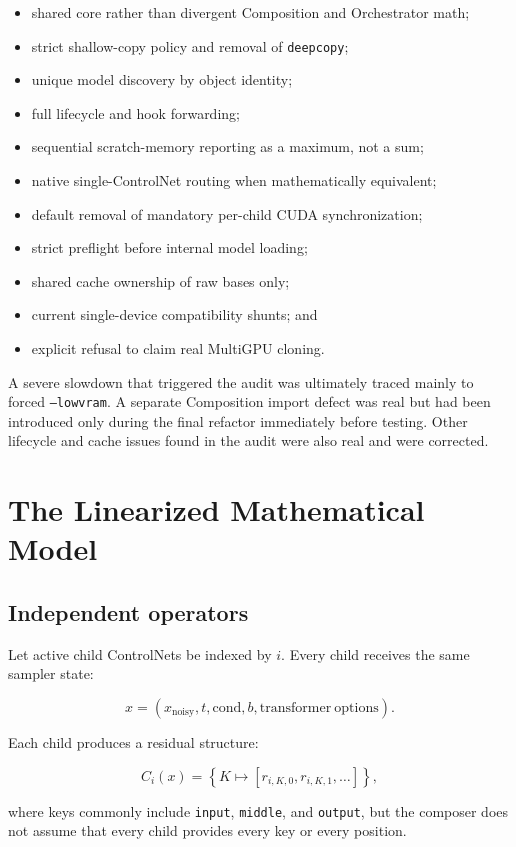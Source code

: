 \documentclass[11pt]{article}
\newcommand{\code}[1]{\texttt{#1}}
\begin{document}
\begin{itemize}
  \item shared core rather than divergent Composition and Orchestrator math;
  \item strict shallow-copy policy and removal of \code{deepcopy};
  \item unique model discovery by object identity;
  \item full lifecycle and hook forwarding;
  \item sequential scratch-memory reporting as a maximum, not a sum;
  \item native single-ControlNet routing when mathematically equivalent;
  \item default removal of mandatory per-child CUDA synchronization;
  \item strict preflight before internal model loading;
  \item shared cache ownership of raw bases only;
  \item current single-device compatibility shunts; and
  \item explicit refusal to claim real MultiGPU cloning.
\end{itemize}

A severe slowdown that triggered the audit was ultimately traced mainly to forced \code{--lowvram}. A separate Composition import defect was real but had been introduced only during the final refactor immediately before testing. Other lifecycle and cache issues found in the audit were also real and were corrected.

\section{The Linearized Mathematical Model}

\subsection{Independent operators}

Let active child ControlNets be indexed by $i$. Every child receives the same sampler state:

\[
x = (x_{\mathrm{noisy}}, t, \mathrm{cond}, b, \mathrm{transformer\ options}).
\]

Each child produces a residual structure:

\[
C_i(x) = \left\{K \mapsto [r_{i,K,0}, r_{i,K,1}, \ldots]\right\},
\]

where keys commonly include \code{input}, \code{middle}, and \code{output}, but the composer does not assume that every child provides every key or every position.
\end{document}
